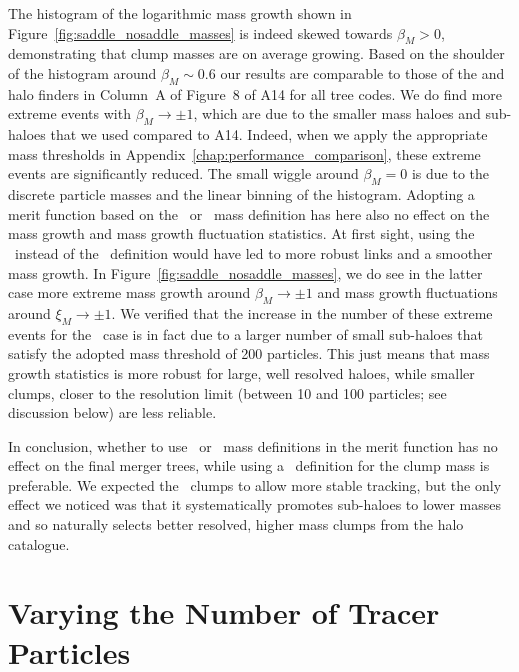 The histogram of the logarithmic mass growth shown in
Figure~\ref{fig:saddle_nosaddle_masses} is indeed skewed towards
$\beta_M > 0$, demonstrating that clump masses are on average growing.
Based on the shoulder of the histogram around $\beta_M \sim 0.6$ our
results are comparable to those of the  and 
halo finders in Column~A of Figure~8 of A14 for all tree codes. We do
find more extreme events with $\beta_M \rightarrow \pm 1$, which are
due to the smaller mass haloes and sub-haloes that we used compared
to A14. Indeed, when we apply the appropriate mass thresholds in
Appendix~\ref{chap:performance_comparison}, these extreme events are
significantly reduced. The small wiggle around $\beta_M = 0$ is due to
the discrete particle masses and the linear binning of the histogram.
Adopting a merit function based on the \inc\ or \exc\ mass definition
has here also no effect on the mass growth and mass growth fluctuation
statistics.  At first sight, using the \sad\ instead of the
\nosad\ definition would have led to more robust links and a smoother
mass growth. In Figure~\ref{fig:saddle_nosaddle_masses}, we do see in
the latter case more extreme mass growth around $\beta_M \rightarrow
\pm 1$ and mass growth fluctuations around $\xi_M \rightarrow \pm
1$. We verified that the increase in the number of these extreme
events for the \nosad\ case is in fact due to a larger number of small
sub-haloes that satisfy the adopted mass threshold of 200 particles.
This just means that mass growth statistics is more robust for large,
well resolved haloes, while smaller clumps, closer to the resolution
limit (between 10 and 100 particles; see discussion below) are less
reliable.

In conclusion, whether to use \inc\ or \exc\ mass definitions in the
merit function has no effect on the final merger trees, while using a
\sad\ definition for the clump mass is preferable. We expected the
\sad\ clumps to allow more stable tracking, but the only effect we
noticed was that it systematically promotes
sub-haloes to lower masses and so naturally selects better resolved,
higher mass clumps from the halo catalogue.


\section{Varying the Number of Tracer Particles} \label{chap:testing-nmb}

